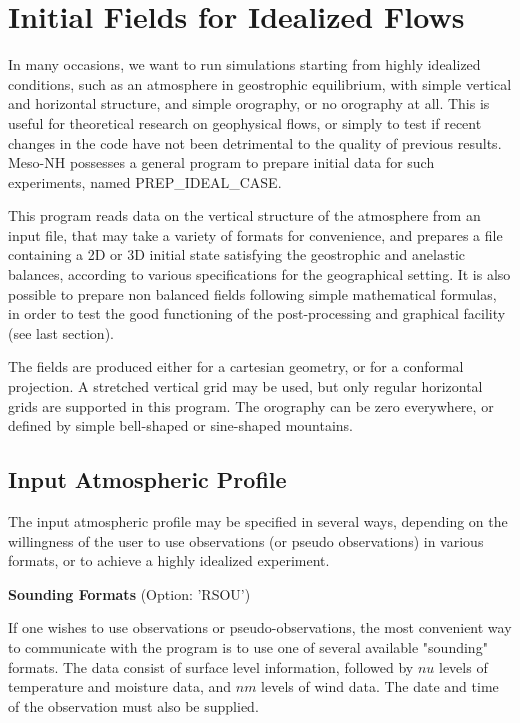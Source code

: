 \chapter{Initial Fields for Idealized Flows}
\minitoc


In many occasions, we want to run simulations starting from highly idealized
conditions, such as an atmosphere in geostrophic equilibrium, with simple
vertical and horizontal structure, and simple orography, or no orography
at all.  This is useful
for theoretical research on geophysical flows, or simply to test if recent
changes in the code have not been detrimental to the quality of previous
results.  Meso-NH possesses a general program to prepare initial data for
such experiments, named PREP\_IDEAL\_CASE.

This program reads data on the
vertical structure of the atmosphere from an input file, that may take a
variety of formats for convenience, and prepares a file containing a 2D or 3D
initial state satisfying the geostrophic and anelastic balances,
according to various specifications for the geographical setting.
It is also possible to prepare non balanced fields following simple mathematical
formulas, in order to test the good functioning of the post-processing
and graphical facility (see last section).

The fields are produced either for a cartesian geometry, or for a conformal
projection.  A stretched vertical grid may be used, but only regular horizontal
grids are supported in this program. The orography can be zero everywhere,
or defined by simple bell-shaped or sine-shaped mountains.

\section{Input Atmospheric Profile}
The input atmospheric profile may be specified in several ways, depending
on the willingness of the user to use observations (or pseudo observations)
in various formats, or to achieve a highly idealized experiment.

{\bf Sounding Formats } (Option: 'RSOU')

If one wishes to use observations or pseudo-observations, the most convenient
way to communicate with the program is to use one of several available
"sounding" formats. The data consist of surface level information, followed
by $nu$ levels of temperature and moisture data, and $nm$ levels of wind data.
The date and time of the observation must also be supplied.

